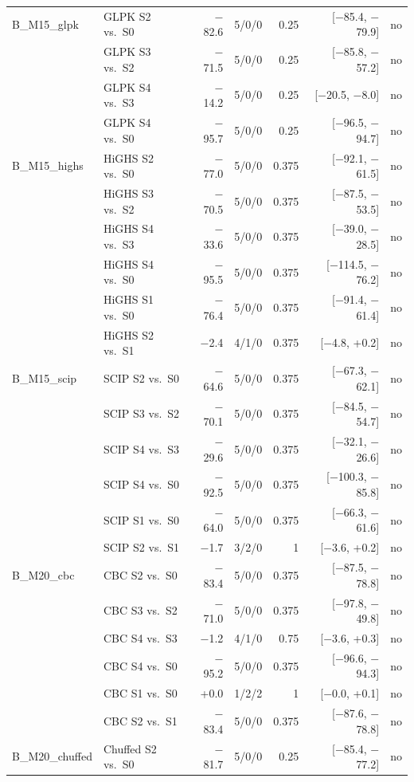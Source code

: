 \begin{longtable}{llrrrrl}
B\_M15\_glpk & GLPK S2 vs.\ S0 & $-$82.6 & 5/0/0 & 0.25 & [$-$85.4, $-$79.9] & no \\
 & GLPK S3 vs.\ S2 & $-$71.5 & 5/0/0 & 0.25 & [$-$85.8, $-$57.2] & no \\
 & GLPK S4 vs.\ S3 & $-$14.2 & 5/0/0 & 0.25 & [$-$20.5, $-$8.0] & no \\
 & GLPK S4 vs.\ S0 & $-$95.7 & 5/0/0 & 0.25 & [$-$96.5, $-$94.7] & no \\
B\_M15\_highs & HiGHS S2 vs.\ S0 & $-$77.0 & 5/0/0 & 0.375 & [$-$92.1, $-$61.5] & no \\
 & HiGHS S3 vs.\ S2 & $-$70.5 & 5/0/0 & 0.375 & [$-$87.5, $-$53.5] & no \\
 & HiGHS S4 vs.\ S3 & $-$33.6 & 5/0/0 & 0.375 & [$-$39.0, $-$28.5] & no \\
 & HiGHS S4 vs.\ S0 & $-$95.5 & 5/0/0 & 0.375 & [$-$114.5, $-$76.2] & no \\
 & HiGHS S1 vs.\ S0 & $-$76.4 & 5/0/0 & 0.375 & [$-$91.4, $-$61.4] & no \\
 & HiGHS S2 vs.\ S1 & $-$2.4 & 4/1/0 & 0.375 & [$-$4.8, +0.2] & no \\
B\_M15\_scip & SCIP S2 vs.\ S0 & $-$64.6 & 5/0/0 & 0.375 & [$-$67.3, $-$62.1] & no \\
 & SCIP S3 vs.\ S2 & $-$70.1 & 5/0/0 & 0.375 & [$-$84.5, $-$54.7] & no \\
 & SCIP S4 vs.\ S3 & $-$29.6 & 5/0/0 & 0.375 & [$-$32.1, $-$26.6] & no \\
 & SCIP S4 vs.\ S0 & $-$92.5 & 5/0/0 & 0.375 & [$-$100.3, $-$85.8] & no \\
 & SCIP S1 vs.\ S0 & $-$64.0 & 5/0/0 & 0.375 & [$-$66.3, $-$61.6] & no \\
 & SCIP S2 vs.\ S1 & $-$1.7 & 3/2/0 & 1 & [$-$3.6, +0.2] & no \\
B\_M20\_cbc & CBC S2 vs.\ S0 & $-$83.4 & 5/0/0 & 0.375 & [$-$87.5, $-$78.8] & no \\
 & CBC S3 vs.\ S2 & $-$71.0 & 5/0/0 & 0.375 & [$-$97.8, $-$49.8] & no \\
 & CBC S4 vs.\ S3 & $-$1.2 & 4/1/0 & 0.75 & [$-$3.6, +0.3] & no \\
 & CBC S4 vs.\ S0 & $-$95.2 & 5/0/0 & 0.375 & [$-$96.6, $-$94.3] & no \\
 & CBC S1 vs.\ S0 & +0.0 & 1/2/2 & 1 & [$-$0.0, +0.1] & no \\
 & CBC S2 vs.\ S1 & $-$83.4 & 5/0/0 & 0.375 & [$-$87.6, $-$78.8] & no \\
B\_M20\_chuffed & Chuffed S2 vs.\ S0 & $-$81.7 & 5/0/0 & 0.25 & [$-$85.4, $-$77.2] & no \\

\end{longtable}
